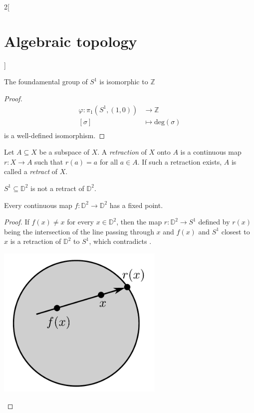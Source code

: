 \documentclass[../../../main_math.tex]{subfiles}
\begin{document}
\begin{multicols}{2}[\section{Algebraic topology}]
  \begin{theorem}
    The foundamental group of $S^1$ is isomorphic to $\mathbb{Z}$
  \end{theorem}

  \begin{proof}
    \begin{align*}
      \varphi: \pi_1(S^1, (1,0)) & \longrightarrow \mathbb{Z}     \\
      [\sigma]                   & \longmapsto \text{deg}(\sigma) \\
    \end{align*}
    is a well-defined isomorphism.
  \end{proof}

  \begin{definition}
    Let $A\subseteq X$ be a subspace of $X$. A \emph{retraction} of $X$ onto $A$ is a continuous map $r: X \to A$ such that $r(a)=a$ for all $a\in A$. If such a retraction exists, $A$ is called a \emph{retract} of $X$.
  \end{definition}

  \begin{corollary}\label{retraccio}
    $S^1\subseteq \mathbb{D}^2$ is not a retract of $\mathbb{D}^2$.
  \end{corollary}


  \begin{theorem}
    \label{Brower}
    Every continuous map $f:\mathbb{D}^2 \to \mathbb{D}^2$ has a fixed point.
  \end{theorem}

  \begin{proof}

    \begin{minipage}{0.3\textwidth}
      If $f(x)\neq x$ for every $x\in \mathbb{D}^2$, then the map $r: \mathbb{D}^2 \to S^1$ defined by $r(x)$ being the intersection of the line passing through $x$ and $f(x)$ and $S^1$ closest to $x$ is a retraction of $\mathbb{D}^2$ to $S^1$, which contradicts .
    \end{minipage}
    \begin{minipage}{0.2\textwidth}
      \begin{center}
        \includegraphics[width=0.6\textwidth]{Images/Brower.pdf}
      \end{center}
    \end{minipage}


\end{proof}
\end{multicols}
\end{document}
